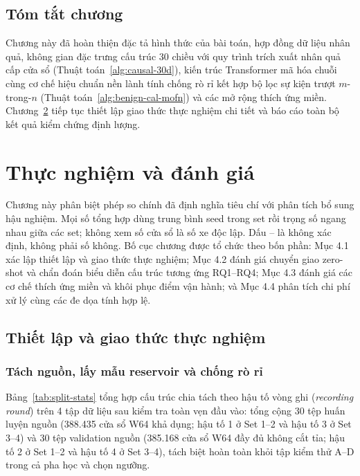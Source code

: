 \documentclass[12pt, a4paper, reqno, oneside]{book}
\begin{document}
\section{Tóm tắt chương}
Chương này đã hoàn thiện đặc tả hình thức của bài toán, hợp đồng dữ liệu nhân quả, không gian đặc trưng cấu trúc 30 chiều với quy trình trích xuất nhân quả cấp cửa sổ (Thuật toán~\ref{alg:causal-30d}), kiến trúc Transformer mã hóa chuỗi cùng cơ chế hiệu chuẩn nền lành tính chống rò rỉ kết hợp bộ lọc sự kiện trượt $m$-trong-$n$ (Thuật toán~\ref{alg:benign-cal-mofn}) và các mở rộng thích ứng miền. Chương~\ref{chap:results} tiếp tục thiết lập giao thức thực nghiệm chi tiết và báo cáo toàn bộ kết quả kiểm chứng định lượng.

\chapter{Thực nghiệm và đánh giá}\label{chap:results}
Chương này phân biệt phép so chính đã định nghĩa tiêu chí với phân tích bổ sung hậu nghiệm. Mọi số tổng hợp dùng trung bình seed trong set rồi trọng số ngang nhau giữa các set; không xem số cửa sổ là số xe độc lập. Dấu -- là không xác định, không phải số không. Bố cục chương được tổ chức theo bốn phần: Mục 4.1 xác lập thiết lập và giao thức thực nghiệm; Mục 4.2 đánh giá chuyển giao zero-shot và chẩn đoán biểu diễn cấu trúc tương ứng RQ1--RQ4; Mục 4.3 đánh giá các cơ chế thích ứng miền và khôi phục điểm vận hành; và Mục 4.4 phân tích chi phí xử lý cùng các đe dọa tính hợp lệ.

\section{Thiết lập và giao thức thực nghiệm}
\subsection{Tách nguồn, lấy mẫu reservoir và chống rò rỉ}
Bảng~\ref{tab:split-stats} tổng hợp cấu trúc chia tách theo hậu tố vòng ghi (\textit{recording round}) trên 4 tập dữ liệu sau kiểm tra toàn vẹn đầu vào: tổng cộng 30 tệp huấn luyện nguồn (388.435 cửa sổ W64 khả dụng; hậu tố 1 ở Set 1--2 và hậu tố 3 ở Set 3--4) và 30 tệp validation nguồn (385.168 cửa sổ W64 đầy đủ không cắt tỉa; hậu tố 2 ở Set 1--2 và hậu tố 4 ở Set 3--4), tách biệt hoàn toàn khỏi tập kiểm thử A--D trong cả pha học và chọn ngưỡng.
\end{document}
